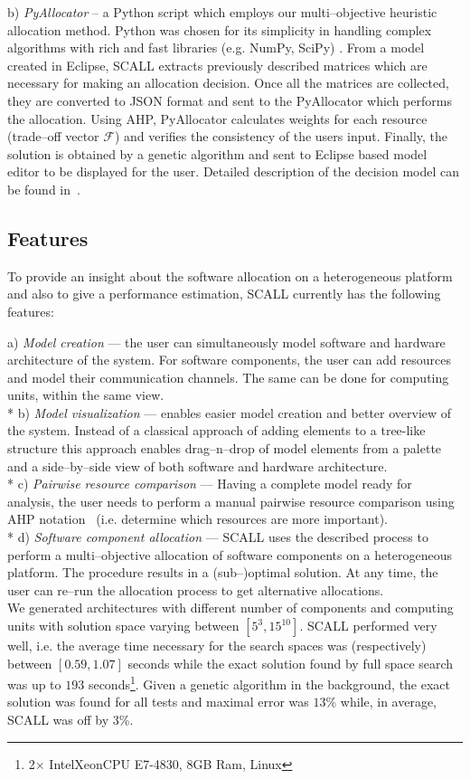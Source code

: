 \documentclass{sig-alternate}
\begin{document}
b) \textit{{PyAllocator}} -- a Python script which employs our multi--objective heuristic allocation method. Python was chosen for its simplicity in handling complex algorithms with rich and fast libraries (e.g. NumPy, SciPy) . From a model created in Eclipse, SCALL extracts previously described matrices which are necessary for making an allocation decision. Once all the matrices are collected, they are converted to JSON format and sent to the PyAllocator which performs the allocation. Using AHP, PyAllocator calculates weights for each resource (trade--off vector $\mathcal{F}$) and verifies the consistency of the users input. Finally, the solution is obtained by a genetic algorithm and sent to Eclipse based model editor to be displayed for the user. Detailed description of the decision model can be found in~\cite{Svogor2013}.

\subsection{Features}
 
To provide an insight about the software allocation on a heterogeneous platform and also to give a performance estimation, SCALL currently has the following features: 


a) \textit{Model creation} --- the user can simultaneously model software and hardware architecture of the system. For software components, the user can add resources and model their communication channels. The same can be done for computing units, within the same view. \\*
b) \textit{Model visualization} --- enables easier model creation and better overview of the system. Instead of a classical approach of adding elements to a tree-like structure this approach enables drag--n--drop of model elements from a palette and a side--by--side view of both software and hardware architecture. \\*
c) \textit{Pairwise resource comparison} --- Having a complete model ready for analysis, the user needs to perform a manual pairwise resource comparison using AHP notation~\cite{saaty1994fundamentals} (i.e. determine which resources are more important). \\*
d) \textit{Software component allocation} --- SCALL uses the described process to perform a multi--objective allocation of software components on a heterogeneous platform. The procedure results in a (sub--)optimal solution. At any time, the user can re--run the allocation process to get alternative allocations. 
\\
We generated architectures with different number of components and computing units with solution space varying between $[5^3, 15^{10}]$. SCALL performed very well, i.e. the average time necessary for the  search spaces was (respectively) between $[0.59, 1.07]$ seconds while the exact solution found by full space search was up to $193$ seconds\footnote{2$\times$ Intel\textregistered Xeon\textregistered CPU E7-4830, 8GB Ram, Linux}. Given a genetic algorithm in the background, the exact solution was found for all tests and maximal error was $13$\% while, in average, SCALL was off by 3\%. 
\end{document}
